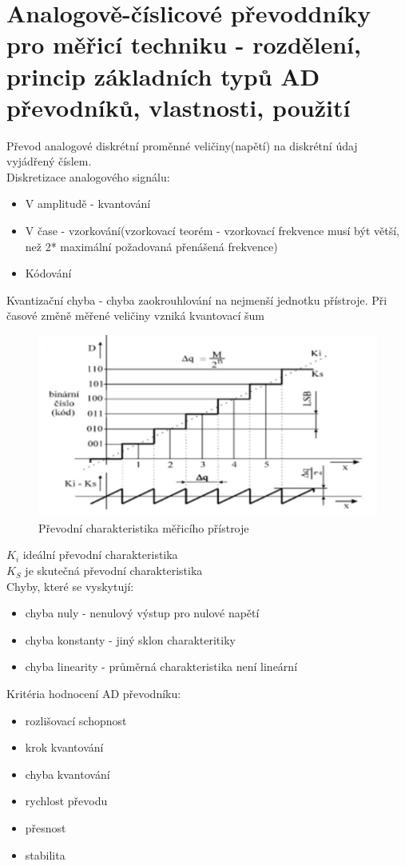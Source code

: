 \section{Analogově-číslicové převoddníky pro měřicí techniku - rozdělení, princip základních typů AD převodníků, vlastnosti, použití}
Převod analogové diskrétní proměnné veličiny(napětí) na diskrétní údaj vyjádřený číslem.\\
Diskretizace analogového signálu:
\begin{itemize}
    \item V amplitudě - kvantování
    \item V čase - vzorkování(vzorkovací teorém - vzorkovací frekvence musí být větší, než 2* maximální požadovaná přenášená frekvence)
    \item Kódování
\end{itemize}
Kvantizační chyba - chyba zaokrouhlování na nejmenší jednotku přístroje. Při časové změně měřené veličiny vzniká kvantovací šum\\
\begin{figure}[H]
    \centering
    \includegraphics*[scale = 1]{images/adc_prevodni_char.png}
    \caption*{Převodní charakteristika měřicího přístroje}
\end{figure}
$K_i$ ideální převodní charakteristika\\
$K_S$ je skutečná převodní charakteristika\\
Chyby, které se vyskytují:
\begin{itemize}
    \item chyba nuly - nenulový výstup pro nulové napětí
    \item chyba konstanty - jiný sklon charakteritiky
    \item chyba linearity - průměrná charakteristika není lineární
\end{itemize}
\newpage
Kritéria hodnocení AD převodníku:
\begin{itemize}
    \item rozlišovací schopnost
    \item krok kvantování
    \item chyba kvantování
    \item rychlost převodu 
    \item přesnost 
    \item stabilita
\end{itemize}

